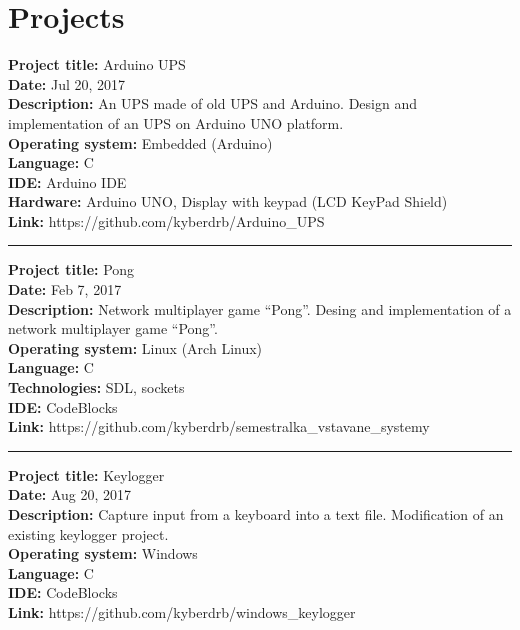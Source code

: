 \documentclass{article}
\begin{document}
\section*{Projects}\label{projects}

\textbf{Project title:} Arduino UPS\\
\textbf{Date:} Jul 20, 2017\\
\textbf{Description:} An UPS made of old UPS and Arduino. Design and implementation of an UPS on Arduino UNO platform.\\
\textbf{Operating system:} Embedded (Arduino)\\
\textbf{Language:} C\\
\textbf{IDE:} Arduino IDE\\
\textbf{Hardware:} Arduino UNO, Display with keypad (LCD KeyPad Shield)\\
\textbf{Link:} https://github.com/kyberdrb/Arduino\_UPS

\begin{center}\rule{3in}{0.4pt}\end{center}

\noindent
\textbf{Project title:} Pong\\
\textbf{Date:} Feb 7, 2017\\
\textbf{Description:} Network multiplayer game ``Pong''. Desing and implementation of a network multiplayer game ``Pong''.\\
\textbf{Operating system:} Linux (Arch Linux)\\
\textbf{Language:} C\\
\textbf{Technologies:} SDL, sockets\\
\textbf{IDE:} CodeBlocks\\
\textbf{Link:} https://github.com/kyberdrb/semestralka\_vstavane\_systemy

\begin{center}\rule{3in}{0.4pt}\end{center}

\noindent
\textbf{Project title:} Keylogger\\
\textbf{Date:} Aug 20, 2017\\
\textbf{Description:} Capture input from a keyboard into a text file. Modification of an existing keylogger project.\\
\textbf{Operating system:} Windows\\
\textbf{Language:} C\\
\textbf{IDE:} CodeBlocks\\
\textbf{Link:} https://github.com/kyberdrb/windows\_keylogger
\end{document}
